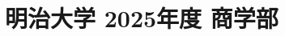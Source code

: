 \documentclass[../../uem_mei_q.tex]{subfiles}
\begin{document}
    \section{明治大学 2025年度 商学部}
    \subsection{　}
    
    \newpage
    \subsection{　}
    
    \newpage
    \subsection{　}
    
\end{document}
